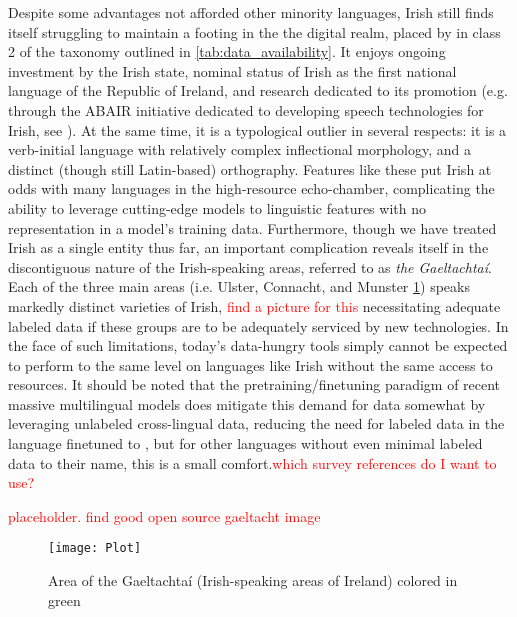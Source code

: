 \documentclass[thesis]{cluu}
\newcommand{\todo}[1]{\textcolor{red}{#1}}
\begin{document}
Despite some advantages not afforded other minority languages, Irish still finds itself struggling to maintain a footing in the the digital realm, placed by \textcite{joshiStateFateLinguistic2021} in class 2 of the taxonomy outlined in \cref{tab:data_availability}. It enjoys ongoing investment by the Irish state, nominal status of Irish as the first national language of the Republic of Ireland, and research dedicated to its promotion (e.g. through the ABAIR initiative dedicated to developing speech technologies for Irish, see \parencite{chasaideABAIRInitiativeBringing2017}). At the same time, it is a typological outlier in several respects: it is a verb-initial language with relatively complex inflectional morphology, and a distinct (though still Latin-based) orthography. Features like these put Irish at odds with many languages in the high-resource echo-chamber, complicating the ability to leverage cutting-edge models to linguistic features with no representation in a model's training data. Furthermore, though we have treated Irish as a single entity thus far, an important complication reveals itself in the discontiguous nature of the Irish-speaking areas, referred to as \textit{the Gaeltachtaí}. Each of the three main areas (i.e. Ulster, Connacht, and Munster \ref{fig:gaeltacht}) speaks markedly distinct varieties of Irish, \todo{find a picture for this} necessitating adequate labeled data if these groups are to be adequately serviced by new technologies. In the face of such limitations, today's data-hungry tools simply cannot be expected to perform to the same level on languages like Irish without the same access to resources. It should be noted that the pretraining/finetuning paradigm of recent massive multilingual models does mitigate this demand for data somewhat by leveraging unlabeled cross-lingual data, reducing the need for labeled data in the language finetuned to \parencite{hedderichSurveyRecentApproaches2021,ranathungaNeuralMachineTranslation2021,joshiStateFateLinguistic2021}, but for other languages without even minimal labeled data to their name, this is a small comfort.\todo{which survey references do I want to use?}

\todo{placeholder. find good open source gaeltacht image}
\begin{figure}[h]
    \caption{Area of the Gaeltachtaí (Irish-speaking areas of Ireland) colored in green}
    \texttt{[image: Plot]}
    \centering
    \label{fig:gaeltacht}
\end{figure} 
\end{document}
